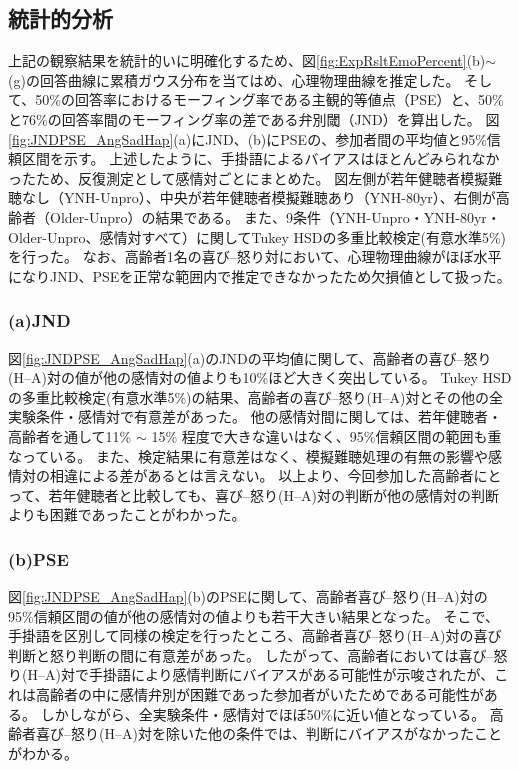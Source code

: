 


\clearpage
\subsection{統計的分析}
\label{sec:Statistics}
上記の観察結果を統計的いに明確化するため、図\ref{fig:ExpRsltEmoPercent}(b)$\sim$(g)の回答曲線に累積ガウス分布を当てはめ、心理物理曲線を推定した。
そして、50\%の回答率におけるモーフィング率である主観的等値点（PSE）と、50\%と76\%の回答率間のモーフィング率の差である弁別閾（JND）を算出した。
図\ref{fig:JNDPSE_AngSadHap}(a)にJND、(b)にPSEの、参加者間の平均値と95\%信頼区間を示す。
上述したように、手掛語によるバイアスはほとんどみられなかったため、反復測定として感情対ごとにまとめた。
図左側が若年健聴者模擬難聴なし（YNH-Unpro）、中央が若年健聴者模擬難聴あり（YNH-80yr）、右側が高齢者（Older-Unpro）の結果である。
また、9条件（YNH-Unpro・YNH-80yr・Older-Unpro、感情対すべて）に関してTukey HSDの多重比較検定(有意水準5\%)を行った。
なお、高齢者1名の喜び--怒り対において、心理物理曲線がほぼ水平になりJND、PSEを正常な範囲内で推定できなかったため欠損値として扱った。

\subsubsection{(a)JND}
図\ref{fig:JNDPSE_AngSadHap}(a)のJNDの平均値に関して、高齢者の喜び--怒り(H--A)対の値が他の感情対の値よりも10\%ほど大きく突出している。
Tukey HSDの多重比較検定(有意水準5\%)の結果、高齢者の喜び--怒り(H--A)対とその他の全実験条件・感情対で有意差があった。
他の感情対間に関しては、若年健聴者・高齢者を通して11\% $\sim$ 15\% 程度で大きな違いはなく、95\%信頼区間の範囲も重なっている。 
また、検定結果に有意差はなく、模擬難聴処理の有無の影響や感情対の相違による差があるとは言えない。
以上より、今回参加した高齢者にとって、若年健聴者と比較しても、喜び--怒り(H--A)対の判断が他の感情対の判断よりも困難であったことがわかった。

\subsubsection{(b)PSE}
図\ref{fig:JNDPSE_AngSadHap}(b)のPSEに関して、高齢者喜び--怒り(H--A)対の95\%信頼区間の値が他の感情対の値よりも若干大きい結果となった。
そこで、手掛語を区別して同様の検定を行ったところ、高齢者喜び--怒り(H--A)対の喜び判断と怒り判断の間に有意差があった。
したがって、高齢者においては喜び--怒り(H--A)対で手掛語により感情判断にバイアスがある可能性が示唆されたが、これは高齢者の中に感情弁別が困難であった参加者がいたためである可能性がある。
しかしながら、全実験条件・感情対でほぼ50\%に近い値となっている。
高齢者喜び--怒り(H--A)対を除いた他の条件では、判断にバイアスがなかったことがわかる。

